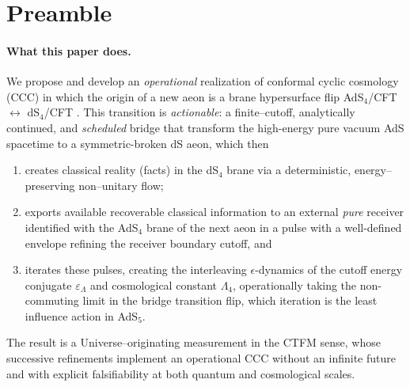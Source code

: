 \documentclass[10pt]{article}
\theoremstyle{definition}
\theoremstyle{plain}
\begin{document}
\begin{abstract}
Phenomenology follows directly. (i) \textbf{LoG CMB imprint:} a degree--scale compensated core with an optional fainter, narrower ring, identified as a Cold Spot anomaly; (ii) \textbf{Shadow--brane--stack dark matter:} a single transfer kernel produces decaying (with the corresponding increase of Hubble constant) to the percent--level uniform ``mirage'' today, a percent-level scale--dependent bias on LSS, and \emph{cored} haloes compatible with clusters constraints and reproducing log-skew unimodal dwarf cores distribution; (iii) \textbf{fifth force-safe} radion phenomenology on the KR head, with any RS1 radion confined to interior/shadow cells; (iv) \textbf{Higgs portal:} the anomaly--LoG DC component freezes a constant Higgs mass shift $\Delta\mu_H^2=-\lambda_p J_0/m_{\mathcal S}^2$, naturally stable for $m_{\mathcal S}\gg v$, with $\delta\kappa_h\ll 10^{-3}$ (quiet colliders) and no late drift of $v$.

\end{abstract}


\section{Preamble}
\label{sec:preamble}

\paragraph{What this paper does.}\label{par:uom-main-001}
We propose and develop an \emph{operational} realization of conformal cyclic cosmology (CCC) \cite{Penrose2010Cycles} in which the origin of a new aeon is a brane hypersurface flip AdS$_4$/CFT $\leftrightarrow$ dS$_4$/CFT \cite{Maldacena1998,Witten1998AdSCFT,GubserKlebanovPolyakov1998,Strominger2001dSCFT}. This transition is \emph{actionable}: a finite–cutoff, analytically continued, and \emph{scheduled} bridge that transform the high-energy pure vacuum AdS spacetime to a symmetric-broken dS aeon, which then 
\begin{enumerate}[label=(\roman*)]
    \item creates classical reality (facts) in the dS$_4$ brane via a deterministic, energy–preserving non–unitary flow;
    \item exports available recoverable classical information to an external \emph{pure} receiver identified with the AdS$_4$ brane of the next aeon in a pulse with a well-defined envelope refining the receiver boundary cutoff, and
    \item iterates these pulses, creating the interleaving $\epsilon$-dynamics of the cutoff energy conjugate $\varepsilon_\Lambda$ and cosmological constant $\Lambda_4$, operationally taking the non-commuting limit in the bridge transition flip, which iteration is the least influence action in AdS$_5$.
\end{enumerate}
The result is a Universe–originating measurement in the CTFM sense, whose successive refinements implement an operational CCC without an infinite future and with explicit falsifiability at both quantum and cosmological scales.
\end{document}
